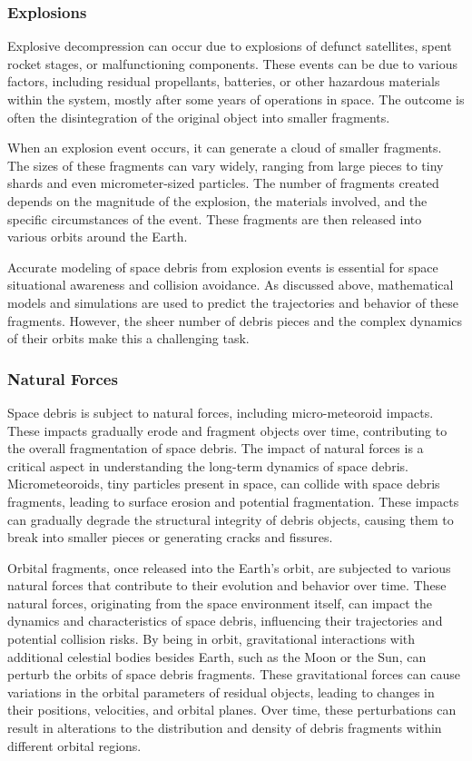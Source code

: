 \documentclass[letterpaper, paper,11pt]{AAS}
\begin{document}
\subsubsection{Explosions}
Explosive decompression can occur due to explosions of defunct satellites, spent rocket stages, or malfunctioning components. These events can be due to various factors, including residual propellants, batteries, or other hazardous materials within the system, mostly after some years of operations in space. The outcome is often the disintegration of the original object into smaller fragments.

When an explosion event occurs, it can generate a cloud of smaller fragments. The sizes of these fragments can vary widely, ranging from large pieces to tiny shards and even micrometer-sized particles. The number of fragments created depends on the magnitude of the explosion, the materials involved, and the specific circumstances of the event. These fragments are then released into various orbits around the Earth.

Accurate modeling of space debris from explosion events is essential for space situational awareness and collision avoidance. As discussed above, mathematical models and simulations are used to predict the trajectories and behavior of these fragments. However, the sheer number of debris pieces and the complex dynamics of their orbits make this a challenging task.

\subsubsection{Natural Forces}
Space debris is subject to natural forces, including micro-meteoroid impacts. These impacts gradually erode and fragment objects over time, contributing to the overall fragmentation of space debris. The impact of natural forces is a critical aspect in understanding the long-term dynamics of space debris. Micrometeoroids, tiny particles present in space, can collide with space debris fragments, leading to surface erosion and potential fragmentation. These impacts can gradually degrade the structural integrity of debris objects, causing them to break into smaller pieces or generating cracks and fissures.

Orbital fragments, once released into the Earth's orbit, are subjected to various natural forces that contribute to their evolution and behavior over time. These natural forces, originating from the space environment itself, can impact the dynamics and characteristics of space debris, influencing their trajectories and potential collision risks. By being in orbit, gravitational interactions with additional celestial bodies besides Earth, such as the Moon or the Sun, can perturb the orbits of space debris fragments. These gravitational forces can cause variations in the orbital parameters of residual objects, leading to changes in their positions, velocities, and orbital planes. Over time, these perturbations can result in alterations to the distribution and density of debris fragments within different orbital regions.
\end{document}
